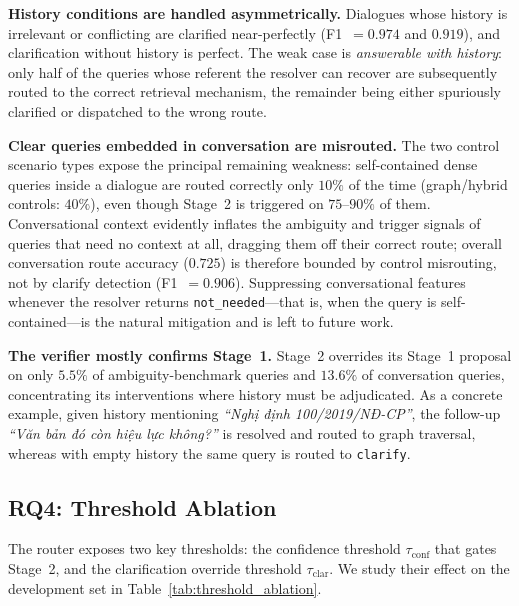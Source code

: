 \noindent\textbf{History conditions are handled asymmetrically.} Dialogues
whose history is irrelevant or conflicting are clarified near-perfectly
(F1~$=0.974$ and $0.919$), and clarification without history is perfect. The
weak case is \emph{answerable with history}: only half of the queries whose
referent the resolver can recover are subsequently routed to the correct
retrieval mechanism, the remainder being either spuriously clarified or
dispatched to the wrong route.

\noindent\textbf{Clear queries embedded in conversation are misrouted.} The
two control scenario types expose the principal remaining weakness:
self-contained dense queries inside a dialogue are routed correctly only
$10\%$ of the time (graph/hybrid controls: $40\%$), even though Stage~2 is
triggered on $75$--$90\%$ of them. Conversational context evidently inflates
the ambiguity and trigger signals of queries that need no context at all,
dragging them off their correct route; overall conversation route accuracy
($0.725$) is therefore bounded by control misrouting, not by clarify
detection (F1~$=0.906$). Suppressing conversational features whenever the
resolver returns \texttt{not\_needed}---that is, when the query is
self-contained---is the natural mitigation and is left to future work.

\noindent\textbf{The verifier mostly confirms Stage~1.} Stage~2 overrides its
Stage~1 proposal on only $5.5\%$ of ambiguity-benchmark queries and $13.6\%$
of conversation queries, concentrating its interventions where history must
be adjudicated. As a concrete example, given history mentioning
\textit{``Nghị định 100/2019/NĐ-CP''}, the follow-up \textit{``Văn bản đó còn
hiệu lực không?''} is resolved and routed to graph traversal, whereas with
empty history the same query is routed to \texttt{clarify}.

\subsection{RQ4: Threshold Ablation}\label{subsec:rq4}

The router exposes two key thresholds: the confidence threshold
$\tau_{\mathrm{conf}}$ that gates Stage~2, and the clarification override
threshold $\tau_{\mathrm{clar}}$. We study their effect on the development set
in Table~\ref{tab:threshold_ablation}.


